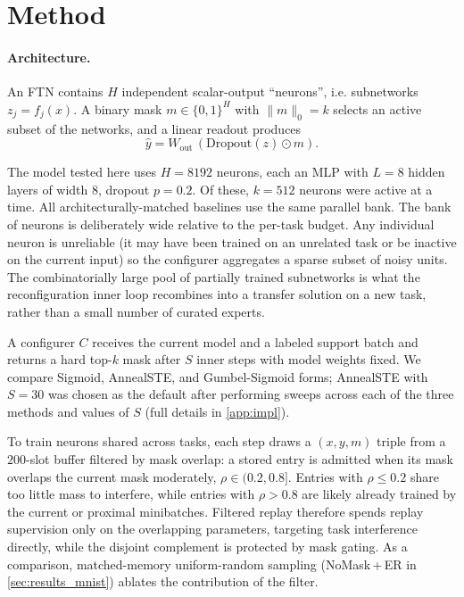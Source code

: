\documentclass[11pt]{article}
\begin{document}
\section{Method}\label{sec:method}

\paragraph{Architecture.}
An FTN contains $H$ independent scalar-output ``neurons'', i.e. subnetworks $z_j=f_j(x)$. A binary mask $m\in\{0,1\}^H$ with $\|m\|_0=k$ selects an active subset of the networks, and a linear readout produces
\[
  \hat{y} = W_\mathrm{out}\,(\mathrm{Dropout}(z)\odot m).
\]

The model tested here uses $H=8192$ neurons, each an MLP with $L=8$ hidden layers of width $8$, dropout $p=0.2$. Of these, $k=512$ neurons were active at a time. All architecturally-matched baselines use the same parallel bank. The bank of neurons is deliberately wide relative to the per-task budget. Any individual neuron is unreliable (it may have been trained on an unrelated task or be inactive on the current input) so the configurer aggregates a sparse subset of noisy units. The combinatorially large pool of partially trained subnetworks is what the reconfiguration inner loop recombines into a transfer solution on a new task, rather than a small number of curated experts.

A configurer $C$ receives the current model and a labeled support batch and returns a hard top-$k$ mask after $S$ inner steps with model weights fixed. We compare Sigmoid, AnnealSTE, and Gumbel-Sigmoid forms; AnnealSTE with $S{=}30$ was chosen as the default after performing sweeps across each of the three methods and values of $S$ (full details in \cref{app:impl}).

To train neurons shared across tasks, each step draws a $(x,y,m)$ triple from a $200$-slot buffer filtered by mask overlap: a stored entry is admitted when its mask overlaps the current mask moderately, $\rho \in (0.2, 0.8]$. Entries with $\rho \le 0.2$ share too little mass to interfere, while entries with $\rho > 0.8$ are likely already trained by the current or proximal minibatches. Filtered replay therefore spends replay supervision only on the overlapping parameters, targeting task interference directly, while the disjoint complement is protected by mask gating. As a comparison, matched-memory uniform-random sampling (NoMask\,+\,ER in \cref{sec:results_mnist}) ablates the contribution of the filter.
\end{document}
